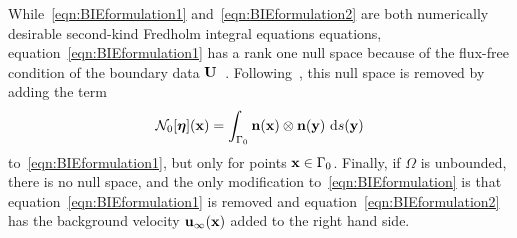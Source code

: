 \documentclass[preprint, 10pt]{elsarticle}
\begin{document}
While~\eqref{eqn:BIEformulation1} and~\eqref{eqn:BIEformulation2} are
both numerically desirable second-kind Fredholm integral equations
equations,
equation~\eqref{eqn:BIEformulation1} has a rank one null space
because of the flux-free condition of the boundary data
${\mathbf{U}}$~\cite{Ladyzhenskaya1963}.  Following~\cite{Power1993}, this null
space is removed by adding the term 
\begin{align}
\label{eqn:N0_modification} 
  \mathcal{N}_0[{\boldsymbol\eta}]({\mathbf{x}}) = \int_{\Gamma_0} 
    {\mathbf{n}}({\mathbf{x}})\otimes{\mathbf{n}}({\mathbf{y}})~\text{d}s({\mathbf{y}})
\end{align}
to~\eqref{eqn:BIEformulation1}, but only for points ${\mathbf{x}} \in \Gamma_0$.
Finally, if $\Omega$ is unbounded, there is no null space, and
the only modification to~\eqref{eqn:BIEformulation} is that
equation~\eqref{eqn:BIEformulation1} is removed and
equation~\eqref{eqn:BIEformulation2} has the background velocity
${\mathbf{u}}_\infty({\mathbf{x}})$ added to the right hand side.
\end{document}
